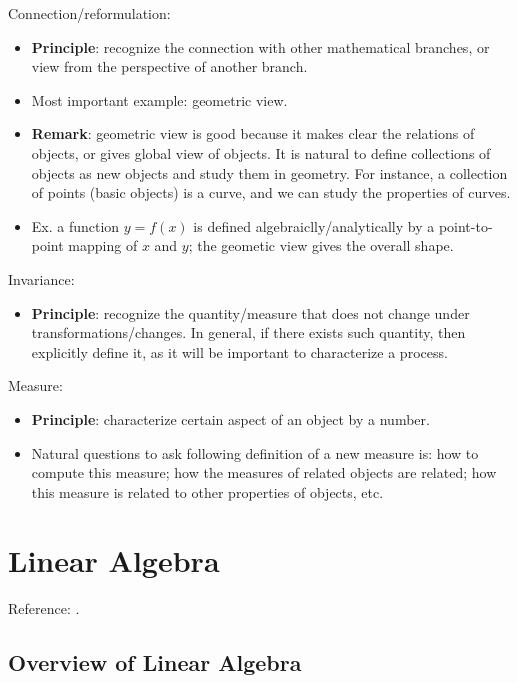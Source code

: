 \documentclass{report}
\begin{document}
Connection/reformulation:
\begin{itemize}
	\item \textbf{Principle}: recognize the connection with other mathematical branches, or view from the perspective of another branch. 
	
	\item Most important example: geometric view. 
	
	\item \textbf{Remark}: geometric view is good because it makes clear the relations of objects, or gives global view of objects. It is natural to define collections of objects as new objects and study them in geometry. For instance, a collection of points (basic objects) is a curve, and we can study the properties of curves.  
	
	\item Ex. a function $y = f(x)$ is defined algebraiclly/analytically by a point-to-point mapping of $x$ and $y$; the geometic view gives the overall shape.
\end{itemize}

Invariance:
\begin{itemize}
	\item \textbf{Principle}: recognize the quantity/measure that does not change under transformations/changes. In general, if there exists such quantity, then explicitly define it, as it will be important to characterize a process. 
\end{itemize}

Measure:
\begin{itemize}
	\item \textbf{Principle}: characterize certain aspect of an object by a number. 
	
	\item Natural questions to ask following definition of a new measure is: how to compute this measure; how the measures of related objects are related; how this measure is related to other properties of objects, etc. 
\end{itemize}


\chapter{Linear Algebra}

Reference: \cite{Leon06, Poole06}. 

\section{Overview of Linear Algebra}
\end{document}
